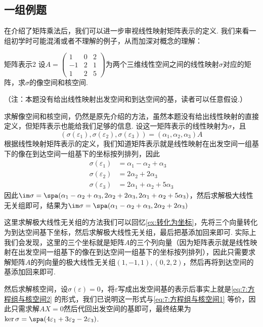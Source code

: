 \subsection{一组例题}

在介绍了矩阵乘法后，我们可以进一步审视线性映射矩阵表示的定义. 我们来看一组初学时可能混淆或者不理解的例子，从而加深对概念的理解：
\begin{example}{}{矩阵表示2}
    设$A=\begin{pmatrix}1 & 0 & 2 \\ -1 & 2 & 1 \\ 1 & 2 & 5\end{pmatrix}$为两个三维线性空间之间的线性映射$\sigma$对应的矩阵，求$\sigma$的像空间和核空间.
\end{example}
（注：本题没有给出线性映射出发空间和到达空间的基，读者可以任意假设.）

\begin{solution}
    求解像空间和核空间，仍然是原先介绍的方法，虽然本题没有给出线性映射的直接定义，但矩阵表示也能给我们足够的信息. 设这一矩阵表示的线性映射为$\sigma$，且
    \[(\sigma(\varepsilon_1),\sigma(\varepsilon_2),\sigma(\varepsilon_3))=(\alpha_1,\alpha_2,\alpha_3)A\]
    根据线性映射矩阵表示的定义，我们知道矩阵表示就是线性映射在出发空间一组基下的像在到达空间一组基下的坐标按列排列，因此
    \begin{align*}
        \sigma(\varepsilon_1) & =\alpha_1-\alpha_2+\alpha_3   \\
        \sigma(\varepsilon_2) & =2\alpha_2+2\alpha_3          \\
        \sigma(\varepsilon_3) & =2\alpha_1+\alpha_2+5\alpha_3
    \end{align*}
    因此$\im\sigma=\spa(\alpha_1-\alpha_2+\alpha_3,2\alpha_2+2\alpha_3,2\alpha_1+\alpha_2+5\alpha_3)$，然后求解极大线性无关组即可，结果为$\im\sigma=\spa(\alpha_1-\alpha_2+\alpha_3,2\alpha_2+2\alpha_3)$

    这里求解极大线性无关组的方法我们可以回忆\autoref{ex:转化为坐标}，先将三个向量转化为到达空间基下坐标，然后求解极大线性无关组，最后把基添加回来即可. 实际上我们会发现，这里的三个坐标就是矩阵$A$的三个列向量（因为矩阵表示就是线性映射在出发空间一组基下的像在到达空间一组基下的坐标按列排列），因此只需要求解矩阵$A$的列向量的极大线性无关组$(1,-1,1),(0,2,2)$，然后再将到达空间的基添加回来即可.

    然后求解核空间，设$\sigma(\varepsilon)=0$，将$\varepsilon$写成出发空间基的表示后事实上就是\autoref{eq:7:方程组与核空间2} 的形式，我们已说明这一形式与\autoref{eq:7:方程组与核空间1} 等价，因此只需求解$AX=0$然后代回出发空间的基即可，最终结果为$\ker\sigma=\spa(4\varepsilon_1+3\varepsilon_2-2\varepsilon_3)$.
\end{solution}

